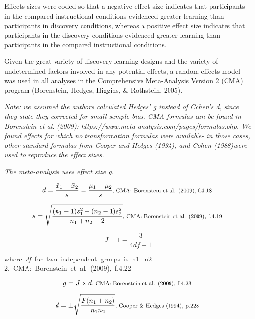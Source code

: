 \documentclass{article}
\begin{document}
Effects sizes were coded so that a negative effect size indicates that participants in the compared instructional conditions evidenced greater learning than participants in discovery conditions, whereas a positive effect size indicates that participants in the discovery conditions evidenced greater learning than participants in the compared instructional conditions.

Given the great variety of discovery learning designs and the variety of undetermined factors involved in any potential effects, a random effects model was used in all analyses in the Comprehensive Meta-Analysis Version 2 (CMA) program (Borenstein, Hedges, Higgins, \& Rothstein, 2005).

\vspace{3 mm}
\textit{Note: we assumed the authors calculated Hedges' g instead of Cohen's d, since they state they corrected for small sample bias. CMA formulas can be found in Borenstein et al. (2009): https://www.meta-analysis.com/pages/formulas.php. We found effects for which no transformation formulas were available- in those cases, other standard formulas from Cooper and Hedges (1994), and Cohen (1988)were used to reproduce the effect sizes.}

\vspace{3mm}
\textit{The meta-analysis uses effect size g.}

\begin{equation*}
d={\frac {{\bar {x}}_{1}-{\bar {x}}_{2}}{s}}={\frac {\mu_{1}-\mu_{2}}{s}} \mbox{\footnotesize, CMA: Borenstein et al. (2009), f.4.18 } 
\end{equation*}

\begin{equation*}
s={\sqrt {\frac {(n_{1}-1)s_{1}^{2}+(n_{2}-1)s_{2}^{2}}{n_{1}+n_{2}-2}}} \mbox{\footnotesize, CMA: Borenstein et al. (2009), f.4.19 } 
\end{equation*}

\begin{equation*}
J={1-{\frac {3}{4df-1}}} 
\end{equation*} 

\mbox{\footnotesize where \textit{df} for two independent groups is n1+n2-2, CMA: Borenstein et al. (2009), f.4.22 }

\begin{equation*}
g=J \times d \mbox{\footnotesize, CMA: Borenstein et al. (2009), f.4.23 } 
\end{equation*}

\begin{equation*}
d=\pm{\sqrt {\frac {F(n_{1}+n_{2})}{n_{1}n_{2}}}} \mbox{\footnotesize, Cooper \& Hedges (1994), p.228 }
\end{equation*}
\end{document}
